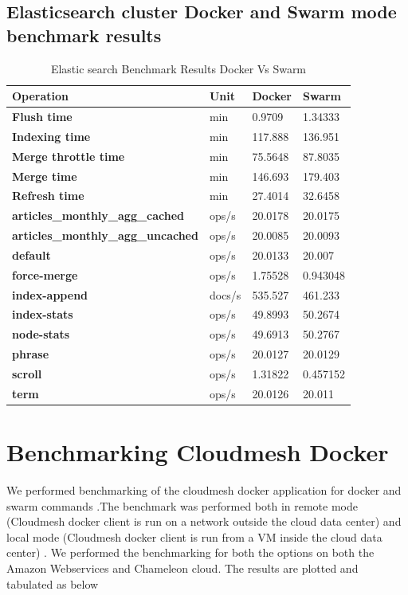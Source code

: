\documentclass[9pt,twocolumn,twoside]{../../styles/osajnl}
\begin{document}
 \subsection{Elasticsearch cluster Docker and Swarm mode benchmark results}

\begin{table}[]
\centering
\caption{Elastic search Benchmark Results Docker Vs Swarm}
\label{my-label}
\begin{tabular}{|l|l|l|l|}
\hline
\textbf{Operation} & \textbf{Unit} & \textbf{Docker} & \textbf{Swarm} \\ \hline
\textbf{Flush time} & min & 0.9709 & 1.34333 \\
\textbf{Indexing time} & min & 117.888 & 136.951 \\
\textbf{Merge throttle time} & min & 75.5648 & 87.8035 \\
\textbf{Merge time} & min & 146.693 & 179.403 \\
\textbf{Refresh time} & min & 27.4014 & 32.6458 \\
\textbf{articles\_monthly\_agg\_cached} & ops/s & 20.0178 & 20.0175 \\
\textbf{articles\_monthly\_agg\_uncached} & ops/s & 20.0085 & 20.0093 \\
\textbf{default} & ops/s & 20.0133 & 20.007 \\
\textbf{force-merge} & ops/s & 1.75528 & 0.943048 \\
\textbf{index-append} & docs/s & 535.527 & 461.233 \\
\textbf{index-stats} & ops/s & 49.8993 & 50.2674 \\
\textbf{node-stats} & ops/s & 49.6913 & 50.2767 \\
\textbf{phrase} & ops/s & 20.0127 & 20.0129 \\
\textbf{scroll} & ops/s & 1.31822 & 0.457152 \\
\textbf{term} & ops/s & 20.0126 & 20.011
\end{tabular}
\end{table}
 
\section{Benchmarking Cloudmesh Docker} 
We performed benchmarking of the cloudmesh docker application for docker and  swarm commands .The benchmark was performed both in remote mode (Cloudmesh docker client is run on a network outside the cloud data center) and local mode (Cloudmesh docker client is run from a VM  inside the cloud data center) . We
performed the benchmarking for both the options on both the Amazon Webservices\cite{www-AWS} and Chameleon cloud\cite{www-Chameleon}.
The results are plotted and tabulated as below
\end{document}
